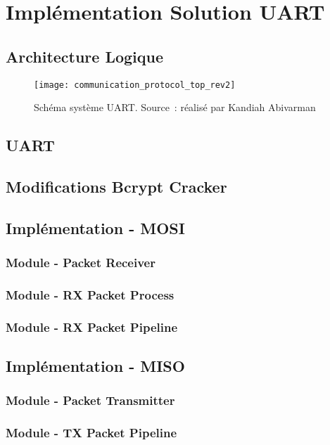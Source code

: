 \section{Implémentation Solution UART}

\subsection{Architecture Logique}

\begin{figure}[tbph!]
	\centering
	\texttt{[image: communication\_protocol\_top\_rev2]}
	\caption[Schéma système UART - FPGA]{Schéma système UART. Source : réalisé par Kandiah Abivarman}
	\label{fig:uart_top_schematics}
\end{figure}

\subsection{UART}

\subsection{Modifications Bcrypt Cracker}

\subsection{Implémentation - MOSI}
\subsubsection{Module - Packet Receiver}
\subsubsection{Module - RX Packet Process}
\subsubsection{Module - RX Packet Pipeline}

\subsection{Implémentation - MISO}
\subsubsection{Module - Packet Transmitter}
\subsubsection{Module - TX Packet Pipeline}

